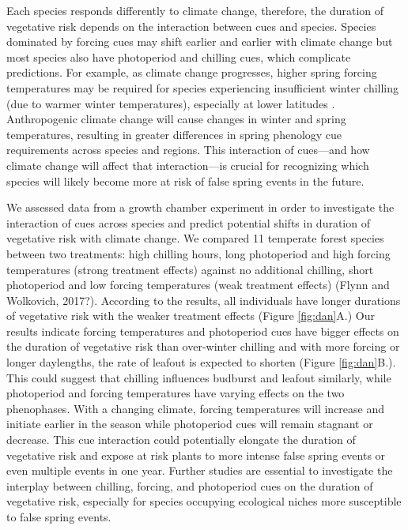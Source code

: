 \documentclass{article}\usepackage[]{graphicx}\usepackage[]{color}
\begin{document}
Each species responds differently to climate change, therefore, the duration of vegetative risk depends on the interaction between cues and species. Species dominated by forcing cues may shift earlier and earlier with climate change but most species also have photoperiod and chilling cues, which complicate predictions. For example, as climate change progresses, higher spring forcing temperatures may be required for species experiencing insufficient winter chilling (due to warmer winter temperatures), especially at lower latitudes \citep{McCreary1990, Morin2009, Fu2012, Polgar2014, Chuine2010}. Anthropogenic climate change will cause changes in winter and spring temperatures, resulting in greater differences in spring phenology cue requirements across species and regions. This interaction of cues---and how climate change will affect that interaction---is crucial for recognizing which species will likely become more at risk of false spring events in the future.

We assessed data from a growth chamber experiment in order to investigate the interaction of cues across species and predict potential shifts in duration of vegetative risk with climate change. We compared 11 temperate forest species between two treatments: high chilling hours, long photoperiod and high forcing temperatures (strong treatment effects) against no additional chilling, short photoperiod and low forcing temperatures (weak treatment effects) (Flynn and Wolkovich, 2017?). According to the results, all individuals have longer durations of vegetative risk with the weaker treatment effects (Figure \ref{fig:dan}A.) Our results indicate forcing temperatures and photoperiod cues have bigger effects on the duration of vegetative risk than over-winter chilling and with more forcing or longer daylengths, the rate of leafout is expected to shorten (Figure \ref{fig:dan}B.). This could suggest that chilling influences budburst and leafout similarly, while photoperiod and forcing temperatures have varying effects on the two phenophases. With a changing climate, forcing temperatures will increase and initiate earlier in the season while photoperiod cues will remain stagnant or decrease. This cue interaction could potentially elongate the duration of vegetative risk and expose at risk plants to more intense false spring events or even multiple events in one year. Further studies are essential to investigate the interplay between chilling, forcing, and photoperiod cues on the duration of vegetative risk, especially for species occupying ecological niches more susceptible to false spring events. 
\end{document}

